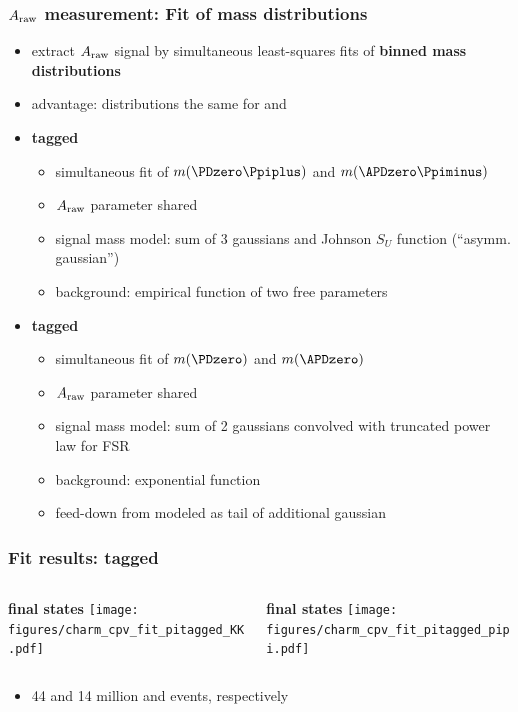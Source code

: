 \documentclass[18pt, aspectratio=169]{beamer}
\newcommand{\kitemph}[1]{\textcolor{kit-green100}{\bf{#1}}}
\begin{document}
\begin{frame}
  \frametitle{$A_{\rm raw}$ measurement: Fit of mass distributions}
  \begin{itemize}
  \item extract $A_{\rm raw}$ signal by simultaneous least-squares fits of \kitemph{binned mass distributions}
  \item advantage: distributions the same for \PKplus\PKminus and \Ppiplus\Ppiminus
  \item \textbf{\Ppi tagged}
    \begin{itemize}
    \item simultaneous fit of $m(\PDzero\Ppiplus)$ and $m(\APDzero\Ppiminus)$
    \item $A_{\rm raw}$ parameter shared
    \item signal mass model: sum of 3 gaussians and Johnson $S_U$ function (``asymm. gaussian'') 
    \item background: empirical function of two free parameters
    \end{itemize}
      \item \textbf{\Pmu tagged}
    \begin{itemize}
    \item simultaneous fit of $m(\PDzero)$ and $m(\APDzero)$
    \item $A_{\rm raw}$ parameter shared
    \item signal mass model: sum of 2 gaussians convolved with truncated power law for FSR
    \item background: exponential function
    \item feed-down from \PKplus\Ppiminus modeled as tail of additional gaussian
    \end{itemize}
  \end{itemize}
  
\end{frame}

\begin{frame}
  \frametitle{Fit results: \Ppi tagged}
  \begin{columns}
    \begin{column}{.5\textwidth}
      \centering
      \textbf{\PKplus\PKminus final states}
      \texttt{[image: figures/charm\_cpv\_fit\_pitagged\_KK.pdf]}
    \end{column}

    \begin{column}{.5\textwidth}
      \centering
            \textbf{\Ppiplus\Ppiminus final states}
      \texttt{[image: figures/charm\_cpv\_fit\_pitagged\_pipi.pdf]}
    \end{column}
  \end{columns}
  \begin{itemize}
  \item 44 and 14 million \PKplus\PKminus and \Ppiplus\Ppiminus events, respectively
  \end{itemize}

\end{frame}
\end{document}
